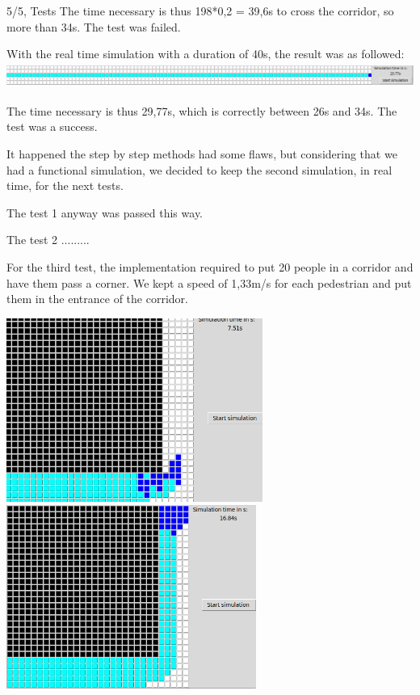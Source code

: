 \documentclass[10pt,a4paper]{article}
\begin{document}
\begin{task}{5/5, Tests}
The time necessary is thus 198*0,2 = 39,6s to cross the corridor, so more than 34s. The test was failed. \newline \newline

With the real time simulation with a duration of 40s, the result was as followed: \newline \newline
\includegraphics[height=0.86cm]{speed5}

The time necessary is thus 29,77s, which is correctly between 26s and 34s. The test was a success. \newline 

It happened the step by step methods had some flaws, but considering that we had a functional simulation, we decided to keep the second simulation, in real time, for the next tests. \newline

 The test 1 anyway was passed this way. \vfill\eject

The test 2 ......... \vfill\eject

For the third test, the implementation required to put 20 people in a corridor and have them pass a corner. We kept a speed of 1,33m/s for each pedestrian and put them in the entrance of the corridor. \newline \newline

\includegraphics[height=6cm]{corner11}
~~~
\includegraphics[height=6cm]{corner12} \newline \newline


\end{task}
\end{document}
